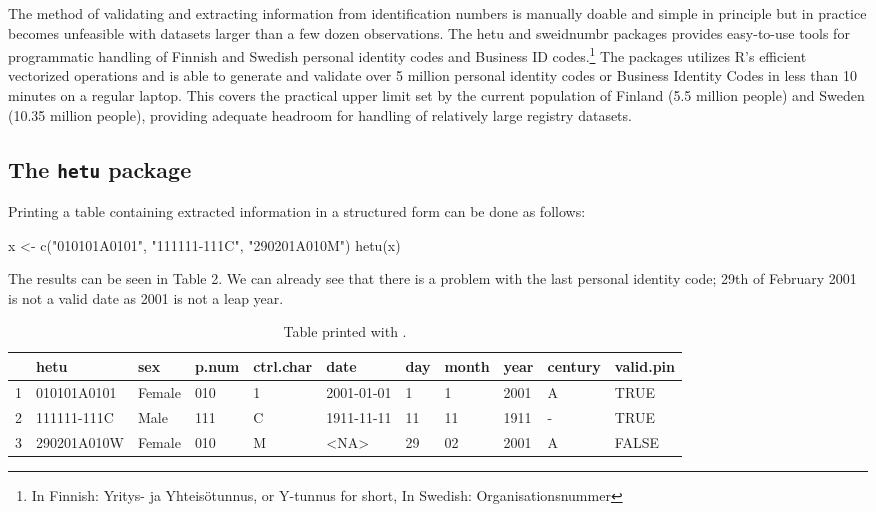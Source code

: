 The method of validating and extracting information from identification numbers is manually doable and simple in principle but in practice becomes unfeasible with datasets larger than a few dozen observations. The hetu and sweidnumbr packages provides easy-to-use tools for programmatic handling of Finnish and Swedish personal identity codes and Business ID codes.\footnote{In Finnish: Yritys- ja Yhteisötunnus, or Y-tunnus for short, In Swedish: Organisationsnummer} The packages utilizes R’s efficient vectorized operations and is able to generate and validate over 5 million personal identity codes or Business Identity Codes in less than 10 minutes on a regular laptop. This covers the practical upper limit set by the current population of Finland (5.5 million people) and Sweden (10.35 million people), providing adequate headroom for handling of relatively large registry datasets.

\subsection{The \texttt{hetu} package}

Printing a table containing extracted information in a structured form can be done as follows:

\begin{example}
  x <- c("010101A0101", "111111-111C", "290201A010M")
  hetu(x)
\end{example}

The results can be seen in Table 2. We can already see that there is a problem with the last personal identity code; 29th of February 2001 is not a valid date as 2001 is not a leap year.

\begin{table}[ht]
\centering
\begin{tabular}{rllllllllll}
\toprule
    & hetu & sex & p.num & ctrl.char & date & day & month & year & century & valid.pin \\
  \hline
  1 & 010101A0101 & Female & 010 & 1 & 2001-01-01 & 1 & 1 & 2001 & A & TRUE \\
  2 & 111111-111C & Male & 111 & C &  1911-11-11 & 11 & 11 & 1911 & - & TRUE \\
  3 & 290201A010W & Female & 010 & M & <NA> & 29 & 02 & 2001 & A & FALSE \\
\bottomrule
\end{tabular}
\caption{Table printed with .}
\label{tab:hetuprintout}
\end{table}


